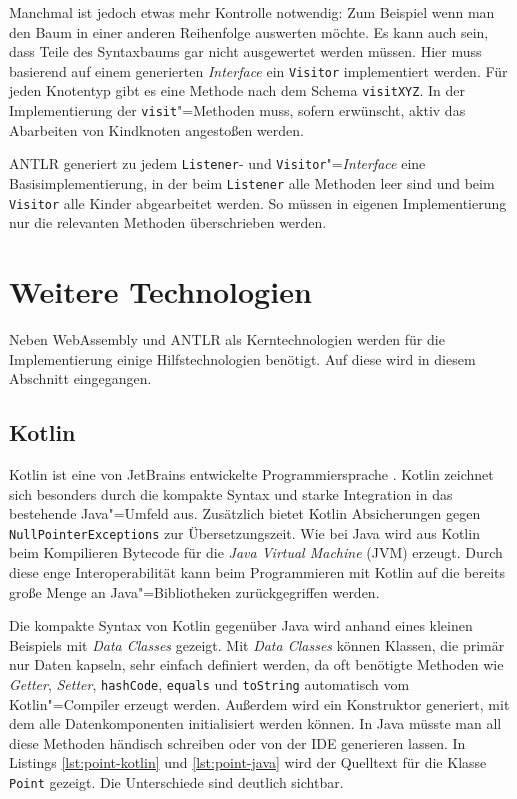 Manchmal ist jedoch etwas mehr Kontrolle notwendig: Zum Beispiel wenn man den Baum in einer anderen Reihenfolge auswerten möchte. Es kann auch sein, dass Teile des Syntaxbaums gar nicht ausgewertet werden müssen. Hier muss basierend auf einem generierten \emph{Interface} ein \lstinline{Visitor} implementiert werden. Für jeden Knotentyp gibt es eine Methode nach dem Schema \lstinline{visitXYZ}. In der Implementierung der \lstinline{visit}"=Methoden muss, sofern erwünscht, aktiv das Abarbeiten von Kindknoten angestoßen werden.

ANTLR generiert zu jedem \lstinline{Listener}- und \lstinline{Visitor}"=\emph{Interface} eine Basisimplementierung, in der beim \lstinline{Listener} alle Methoden leer sind und beim \lstinline{Visitor} alle Kinder abgearbeitet werden. So müssen in eigenen Implementierung nur die relevanten Methoden überschrieben werden.

\pagebreak
\section{Weitere Technologien}

Neben WebAssembly und ANTLR als Kerntechnologien werden für die Implementierung einige Hilfstechnologien benötigt. Auf diese wird in diesem Abschnitt eingegangen.
\subsection{Kotlin}
Kotlin ist eine von JetBrains entwickelte Programmiersprache \cite{KotlinReference}. Kotlin zeichnet sich besonders durch die kompakte Syntax und starke Integration in das bestehende Java"=Umfeld aus. Zusätzlich bietet Kotlin Absicherungen gegen \lstinline{NullPointerExceptions} zur Übersetzungszeit. Wie bei Java wird aus Kotlin beim Kompilieren Bytecode für die \emph{Java Virtual Machine} (JVM) erzeugt. Durch diese enge Interoperabilität kann beim Programmieren mit Kotlin auf die bereits große Menge an Java"=Bibliotheken zurückgegriffen werden.

Die kompakte Syntax von Kotlin gegenüber Java wird anhand eines kleinen Beispiels mit \emph{Data Classes} gezeigt. Mit \emph{Data Classes} können Klassen, die primär nur Daten kapseln, sehr einfach definiert werden, da oft benötigte Methoden wie \emph{Getter}, \emph{Setter}, \lstinline{hashCode}, \lstinline{equals} und \lstinline{toString} automatisch vom Kotlin"=Compiler erzeugt werden. Außerdem wird ein Konstruktor generiert, mit dem alle Datenkomponenten initialisiert werden können. In Java müsste man all diese Methoden händisch schreiben oder von der IDE generieren lassen. In Listings \ref{lst:point-kotlin} und \ref{lst:point-java} wird der Quelltext für die Klasse \lstinline{Point} gezeigt. Die Unterschiede sind deutlich sichtbar.

